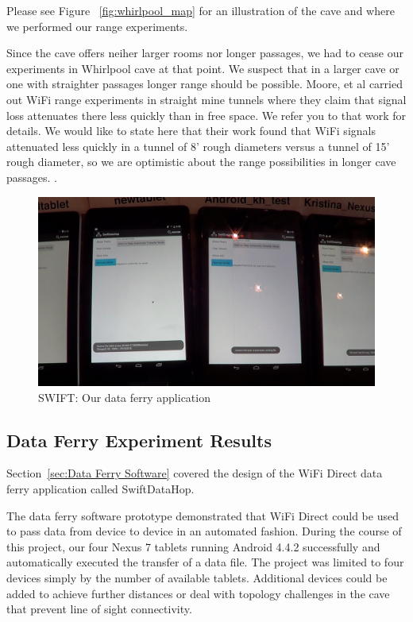 \documentclass[10pt,twocolumn]{article}
\begin{document}
Please see Figure ~\ref{fig:whirlpool_map} for an illustration of the cave and where we performed our range experiments.

Since the cave offers neiher larger rooms nor longer passages, we had to cease our experiments in Whirlpool cave at that point.
We suspect that in a larger cave or one with straighter passages longer range should be possible.
Moore, et al carried out WiFi range experiments in straight mine tunnels where they claim that signal loss attenuates there less quickly than in free space.
We refer you to that work for details.
We would like to state here that their work found that WiFi signals attenuated less quickly in a tunnel of 8' rough diameters versus a tunnel of 15' rough diameter, so we are optimistic about the range possibilities in longer cave passages. \cite{moore2012}.


\begin{figure}[t]
\includegraphics[width=\textwidth]{swift_123}
\caption{SWIFT: Our data ferry application}
\label{fig:dataferry123}
\end{figure}

\subsection{Data Ferry Experiment Results}
\label{sec:Data Ferry Experiment Results}

Section~\ref{sec:Data Ferry Software} covered the design of the WiFi Direct data ferry application called SwiftDataHop. 

The data ferry software prototype demonstrated that WiFi Direct could be used to pass data from device to device in an automated fashion. 
During the course of this project, our four Nexus 7 tablets running Android 4.4.2 successfully and automatically executed the transfer of a data file.
The project was limited to four devices simply by the number of available tablets.
Additional devices could be added to achieve further distances or deal with topology challenges in the cave that prevent line of sight connectivity. 
\end{document}
